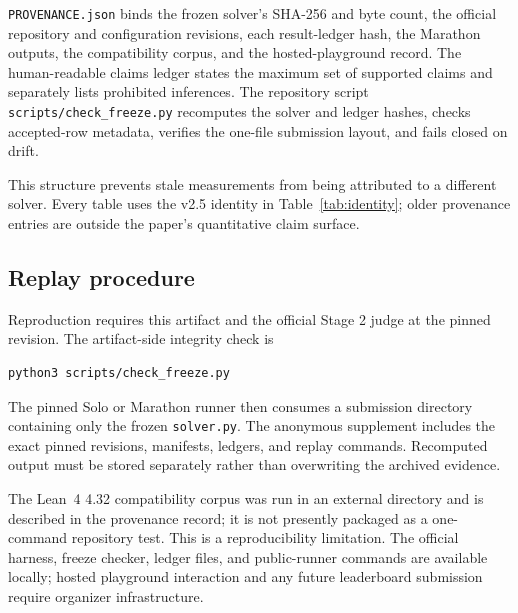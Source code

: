\documentclass[10pt,twocolumn]{article}
\newcommand{\lean}{Lean~4\xspace}
\newcommand{\code}[1]{\texttt{#1}}
\begin{document}
\code{PROVENANCE.json} binds the frozen solver's SHA-256 and byte count, the
official repository and configuration revisions, each result-ledger hash, the
Marathon outputs, the compatibility corpus, and the hosted-playground record.
The human-readable claims ledger states the maximum set of supported claims
and separately lists prohibited inferences.  The repository script
\code{scripts/check\_freeze.py} recomputes the solver and ledger hashes, checks
accepted-row metadata, verifies the one-file submission layout, and fails
closed on drift.

This structure prevents stale measurements from being attributed to a
different solver.  Every table uses the v2.5 identity in
Table~\ref{tab:identity}; older provenance entries are outside the paper's
quantitative claim surface.

\subsection{Replay procedure}

Reproduction requires this artifact and the official Stage 2 judge at the
pinned revision.  The artifact-side integrity check is
\begin{verbatim}
python3 scripts/check_freeze.py
\end{verbatim}
The pinned Solo or Marathon runner then consumes a submission directory
containing only the frozen \code{solver.py}.
The anonymous supplement includes the exact pinned revisions, manifests,
ledgers, and replay commands.  Recomputed output must be stored separately
rather than overwriting the archived evidence.

The \lean 4.32 compatibility corpus was run in an external directory and is
described in the provenance record; it is not presently packaged as a
one-command repository test.  This is a reproducibility limitation.  The
official harness, freeze checker, ledger files, and public-runner commands are
available locally; hosted playground interaction and any future leaderboard
submission require organizer infrastructure.
\end{document}
